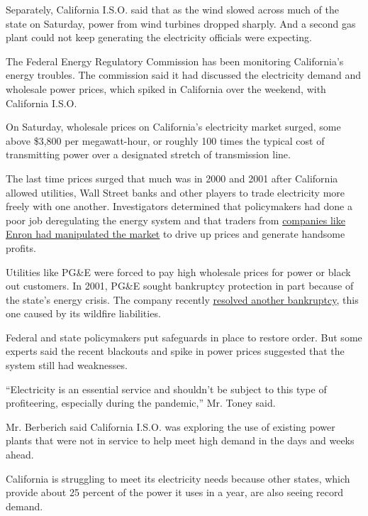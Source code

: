 Separately, California I.S.O. said that as the wind slowed across much
of the state on Saturday, power from wind turbines dropped sharply. And
a second gas plant could not keep generating the electricity officials
were expecting.

The Federal Energy Regulatory Commission has been monitoring
California's energy troubles. The commission said it had discussed the
electricity demand and wholesale power prices, which spiked in
California over the weekend, with California I.S.O.

On Saturday, wholesale prices on California's electricity market surged,
some above \$3,800 per megawatt-hour, or roughly 100 times the typical
cost of transmitting power over a designated stretch of transmission
line.

The last time prices surged that much was in 2000 and 2001 after
California allowed utilities, Wall Street banks and other players to
trade electricity more freely with one another. Investigators determined
that policymakers had done a poor job deregulating the energy system and
that traders from
\href{https://www.nytimes3xbfgragh.onion/2002/05/07/business/enron-forced-up-california-prices-documents-show.html}{companies
like Enron had manipulated the market} to drive up prices and generate
handsome profits.

Utilities like PG\&E were forced to pay high wholesale prices for power
or black out customers. In 2001, PG\&E sought bankruptcy protection in
part because of the state's energy crisis. The company recently
\href{https://www.nytimes3xbfgragh.onion/2020/06/19/business/energy-environment/pge-bankruptcy-court-approval.html}{resolved
another bankruptcy}, this one caused by its wildfire liabilities.

Federal and state policymakers put safeguards in place to restore order.
But some experts said the recent blackouts and spike in power prices
suggested that the system still had weaknesses.

``Electricity is an essential service and shouldn't be subject to this
type of profiteering, especially during the pandemic,'' Mr. Toney said.

Mr. Berberich said California I.S.O. was exploring the use of existing
power plants that were not in service to help meet high demand in the
days and weeks ahead.

California is struggling to meet its electricity needs because other
states, which provide about 25 percent of the power it uses in a year,
are also seeing record demand.

